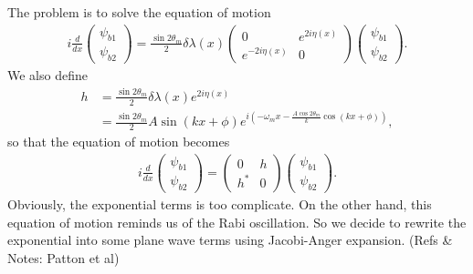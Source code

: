 \documentclass[letterpaper,12pt,english]{sphinxmanual}
\begin{document}
The problem is to solve the equation of motion
\begin{equation*}
\begin{split}i \frac{d}{dx} \begin{pmatrix} \psi_{b1} \\ \psi_{b2} \end{pmatrix} = \frac{\sin 2\theta_m}{2}\delta\lambda(x) \begin{pmatrix} 0 &  e^{2i\eta(x)} \\   e^{-2i\eta(x)} &  0 \end{pmatrix}  \begin{pmatrix} \psi_{b1} \\ \psi_{b2} \end{pmatrix} .\end{split}
\end{equation*}
We also define
\label{\detokenize{matter-stimulated/single-frequency:equation-single-frequency-hamiltonian-element}}\begin{equation}\label{equation:matter-stimulated/single-frequency:single-frequency-hamiltonian-element}
\begin{split}h &= \frac{\sin 2\theta_m}{2}\delta\lambda(x)  e^{2i\eta(x)} \\
& = \frac{\sin 2\theta_m}{2} A \sin (kx+\phi) e^{i\left( -\omega_m x - \frac{A \cos 2\theta_m}{k} \cos (kx+\phi) \right)},\end{split}
\end{equation}
so that the equation of motion becomes
\begin{equation*}
\begin{split}i \frac{d}{dx} \begin{pmatrix} \psi_{b1} \\ \psi_{b2} \end{pmatrix} =  \begin{pmatrix} 0 &  h \\   h^* &  0 \end{pmatrix}  \begin{pmatrix} \psi_{b1} \\ \psi_{b2} \end{pmatrix} .\end{split}
\end{equation*}
Obviously, the exponential terms is too complicate. On the other hand, this equation of motion reminds us of the Rabi oscillation. So we decide to rewrite the exponential into some plane wave terms using Jacobi-Anger expansion. (Refs \& Notes: Patton et al)
\end{document}
